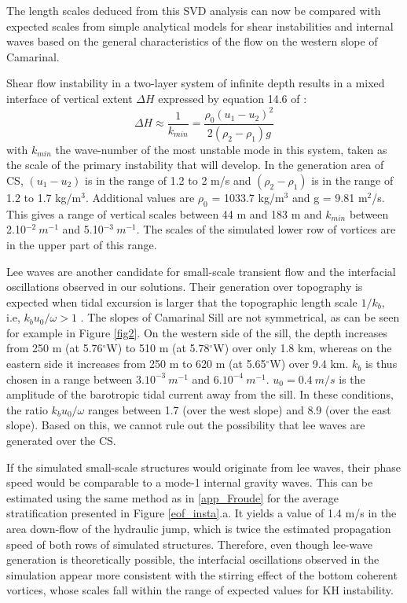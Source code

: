 The length scales deduced from this SVD analysis can now be compared with expected scales from simple analytical models for shear instabilities and internal waves based on the general characteristics of the flow on the western slope of Camarinal.

Shear flow instability in a two-layer system of infinite depth results in a mixed interface of vertical extent $\Delta H$ expressed by equation 14.6 of \citet{Cushman-RoisinBenoit2011} :
%
\begin{equation}
\Delta H \approx \frac{1}{k_{min}} = \frac{\rho_0 (u_1 - u_2)^2}{2(\rho_2-\rho_1)g}
\end{equation}
%
with $k_{min}$ the wave-number of the most unstable mode in this system, taken as the scale of the primary instability that will develop. In the generation area of CS, $(u_1-u_2)$ is in the range of 1.2 to 2 m/s and $(\rho_2-\rho_1)$ is in the range of 1.2 to 1.7 kg/m$^3$. Additional values are $\rho_0$ = 1033.7 kg/m$^3$ and g = 9.81 m$^2$/s. This gives a range of vertical scales between 44 m and 183 m and $k_{min}$ between 2.10$^{-2}\ m^{-1}$ and 5.10$^{-3}\ m^{-1}$. The scales of the simulated lower row of vortices are in the upper part of this range.

Lee waves are another candidate for small-scale transient flow and the interfacial oscillations observed in our solutions. Their generation over topography is expected when tidal excursion is larger that the topographic length scale $1/k_b$, i.e, $k_b u_0/\omega > 1$ \citep{StLaurent2002}. The slopes of Camarinal Sill are not symmetrical, as can be seen for example in Figure \ref{fig2}. On the western side of the sill, the depth increases from 250 m (at 5.76$^\circ$W) to 510 m (at 5.78$^\circ$W) over only 1.8 km, whereas on the eastern side it increases from 250 m to 620 m (at 5.65$^\circ$W) over 9.4 km. $k_b$ is thus chosen in a range between $3.10^{-3}\ m^{-1}$ and $6.10^{-4}\ m^{-1}$. $u_0=0.4\ m/s$ is the amplitude of the barotropic tidal current away from the sill. In these conditions, the ratio $k_b u_0/\omega$ ranges between 1.7 (over the west slope) and 8.9 (over the east slope). Based on this, we cannot rule out the possibility that lee waves are generated over the CS.

If the simulated small-scale structures would originate from lee waves, their phase speed would be comparable to a mode-1 internal gravity waves. This can be estimated using the same method as in \ref{app_Froude} for the average stratification presented in Figure \ref{eof_insta}.a. It yields a value of 1.4 m/s in the area down-flow of the hydraulic jump, which is twice the estimated propagation speed of both rows of simulated structures. Therefore, even though lee-wave generation is theoretically possible, the interfacial oscillations observed in the simulation appear more consistent with the stirring effect of the bottom coherent vortices, whose scales fall within the range of expected values for KH instability.


